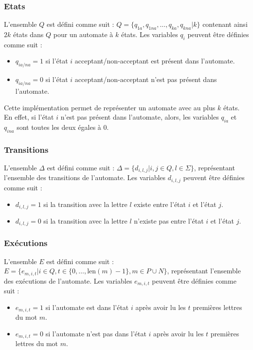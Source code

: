 \documentclass[a4paper, 12pt]{extarticle}
\begin{document}
\subsubsection{Etats}
\label{sec:etats}

\noindent L'ensemble $Q$ est défini comme suit : $Q = \{q_{1a}, q_{1na}, \dots, q_{ka}, q_{kna} | k\}$ contenant
ainsi $2k$ états dans $Q$ pour un automate à $k$ états. Les variables $q_i$ peuvent être définies comme suit : 
\begin{itemize}[label=$\bullet$]
    \item $q_{ia/na} = 1$ si l'état $i$ acceptant/non-acceptant est présent dans l'automate.
    \item $q_{ia/na} = 0$ si l'état $i$ acceptant/non-acceptant n'est pas présent dans l'automate.
\end{itemize}
Cette implémentation permet de représenter un automate avec au plus $k$ états. En effet, si l'état $i$ n'est pas présent dans l'automate, 
alors, les variables $q_{ia}$ et $q_{ina}$ sont toutes les deux égales à 0. 


\subsubsection{Transitions} 
\label{sec:transitions} 

\noindent L'ensemble $\Delta$ est défini comme suit : $\Delta = \{d_{i, l, j} | i, j \in Q, l \in \Sigma\}$, représentant
l'ensemble des transitions de l'automate. Les variables $d_{i, l, j}$ peuvent être définies comme suit : 
\begin{itemize}[label=$\bullet$]
    \item $d_{i, l, j} = 1$ si la transition avec la lettre $l$ existe entre l'état $i$ et l'état $j$.
    \item $d_{i, l, j} = 0$ si la transition avec la lettre $l$ n'existe pas entre l'état $i$ et l'état $j$.
\end{itemize} 


\subsubsection{Exécutions}
\label{sec:executions}

\noindent L'ensemble $E$ est défini comme suit : $E = \{e_{m, i, t} | i \in Q, t \in \{0,\dots,\text{len}(m)-1\}, m \in P \cup N\}$,
représentant l'ensemble des exécutions de l'automate. Les variables $e_{m, i, t}$ peuvent être définies comme suit :
\begin{itemize}[label=$\bullet$]
    \item $e_{m, i, t} = 1$ si l'automate est dans l'état $i$ après avoir lu les $t$ premières lettres du mot $m$.
    \item $e_{m, i, t} = 0$ si l'automate n'est pas dans l'état $i$ après avoir lu les $t$ premières lettres du mot $m$.
\end{itemize}
\end{document}
